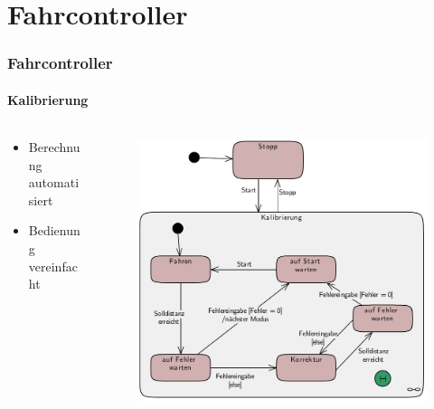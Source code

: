 \section{Fahrcontroller}
\begin{frame}
\frametitle{Fahrcontroller}
\framesubtitle{Kalibrierung}

\begin{columns}
	\begin{column}{0.42 \textwidth}
		\begin{itemize}
			\item Berechnung automatisiert
			\item Bedienung vereinfacht
		\end{itemize}
	\end{column}
	\begin{column}{0.58 \textwidth}
		\vspace{-2.8em}
		\begin{figure}[h]
			\centering
			\includegraphics[width = 1 \textwidth]{../images/DC/calSMPres}
		\end{figure}
	\end{column}
\end{columns}

\end{frame}

